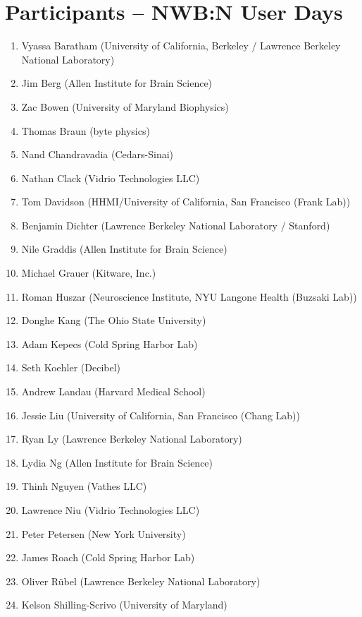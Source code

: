 \documentclass{article}
\begin{document}
\section{Participants -- NWB:N User Days}
\label{sec:userparticipants}

\begin{multicols}{2}
\begin{enumerate}[leftmargin=*]
\setlength\itemsep{0cm}
\item Vyassa Baratham (University of California, Berkeley / Lawrence Berkeley National Laboratory)
\item Jim Berg (Allen Institute for Brain Science)
\item Zac Bowen (University of Maryland Biophysics)
\item Thomas Braun (byte physics)
\item Nand Chandravadia (Cedars-Sinai)
\item Nathan Clack (Vidrio Technologies LLC)
\item Tom Davidson (HHMI/University of California, San Francisco (Frank Lab))
\item Benjamin Dichter (Lawrence Berkeley National Laboratory / Stanford)
\item Nile Graddis (Allen Institute for Brain Science)
\item Michael Grauer (Kitware, Inc.)
\item Roman Huszar (Neuroscience Institute, NYU Langone Health (Buzsaki Lab))
\item Donghe  Kang (The Ohio State University)
\item Adam Kepecs (Cold Spring Harbor Lab)
\item Seth Koehler (Decibel)
\item Andrew Landau (Harvard Medical School)
\item Jessie Liu (University of California, San Francisco  (Chang Lab))
\item Ryan Ly (Lawrence Berkeley National Laboratory)
\item Lydia Ng (Allen Institute for Brain Science)
\item Thinh Nguyen (Vathes LLC)
\item Lawrence Niu (Vidrio Technologies LLC)
\item Peter Petersen (New York University)
\item James Roach (Cold Spring Harbor Lab)
\item Oliver R\"ubel (Lawrence Berkeley National Laboratory)
\item Kelson Shilling-Scrivo (University of Maryland)

\end{enumerate}
\end{multicols}
\end{document}

